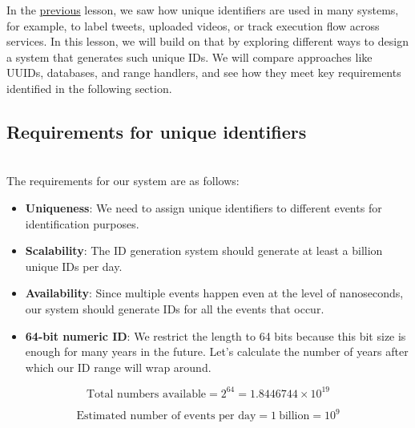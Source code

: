 

In the \href{https://www.educative.io/courses/grokking-the-system-design-interview/system-design-sequencer}{previous} lesson, we saw how unique identifiers are used in many systems, for example, to label tweets, uploaded videos, or track execution flow across services. In this lesson, we will build on that by exploring different ways to design a system that generates such unique IDs. We will compare approaches like UUIDs, databases, and range handlers, and see how they meet key requirements identified in the following section.

\subsection{Requirements for unique identifiers}\label{EihVyTMdOtLr675uvt-lS}
\\
The requirements for our system are as follows:

\begin{itemize}
\item
\protect{}\label{GB3Ra0WLGouK7mfFjw_QE}
\textbf{Uniqueness}: We need to assign unique identifiers to different events for identification purposes.
\item
\protect{}\label{dUcm7cNpdboS81CR-I_EG}
\textbf{Scalability}: The ID generation system should generate at least a billion unique IDs per day.
\item
\protect{}\label{lVHsRGjBpSzGqEyfSMZSB}
\textbf{Availability}: Since multiple events happen even at the level of nanoseconds, our system should generate IDs for all the events that occur.
\item
\protect{}\label{jsviEe2sTT_5etJpd4F0s}
\textbf{64-bit numeric ID}: We restrict the length to 64 bits because this bit size is enough for many years in the future. Let's calculate the number of years after which our ID range will wrap around.
\end{itemize}

\[
\text{Total numbers available} = 2^{64} = 1.8446744 \times 10^{19}
\]

\[
\text{Estimated number of events per day} = 1 \ \text{billion} = 10^{9}
\]


